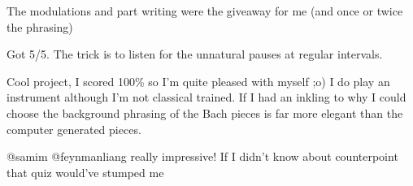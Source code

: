 \documentclass[dissertation.tex]{subfiles}
\begin{document}
The modulations and part writing were the giveaway for me (and once or twice the phrasing)

Got 5/5. The trick is to listen for the unnatural pauses at regular intervals.

Cool project, I scored 100\% so I'm quite pleased with myself ;o) I do
play an instrument although I'm not classical trained. If I had an
inkling to why I could choose the background phrasing of the Bach
pieces is far more elegant than the computer generated pieces.

@samim @feynmanliang really impressive! If I didn't know about counterpoint that quiz would've stumped me



\printbibliography
\end{document}
